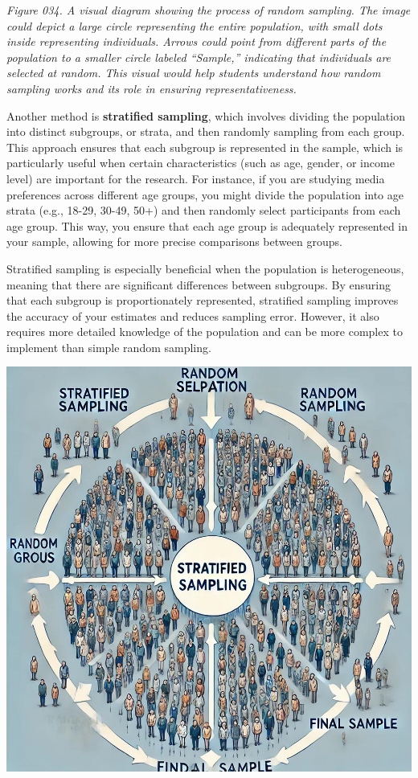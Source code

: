 \documentclass[
]{book}
\begin{document}
\emph{Figure 034. A visual diagram showing the process of random sampling. The image could depict a large circle representing the entire population, with small dots inside representing individuals. Arrows could point from different parts of the population to a smaller circle labeled ``Sample,'' indicating that individuals are selected at random. This visual would help students understand how random sampling works and its role in ensuring representativeness.}

Another method is \textbf{stratified sampling}, which involves dividing the population into distinct subgroups, or strata, and then randomly sampling from each group. This approach ensures that each subgroup is represented in the sample, which is particularly useful when certain characteristics (such as age, gender, or income level) are important for the research. For instance, if you are studying media preferences across different age groups, you might divide the population into age strata (e.g., 18-29, 30-49, 50+) and then randomly select participants from each age group. This way, you ensure that each age group is adequately represented in your sample, allowing for more precise comparisons between groups.

Stratified sampling is especially beneficial when the population is heterogeneous, meaning that there are significant differences between subgroups. By ensuring that each subgroup is proportionately represented, stratified sampling improves the accuracy of your estimates and reduces sampling error. However, it also requires more detailed knowledge of the population and can be more complex to implement than simple random sampling.

\includegraphics[width=1\linewidth,height=\textheight,keepaspectratio]{images/fig035.jpg}
\end{document}
